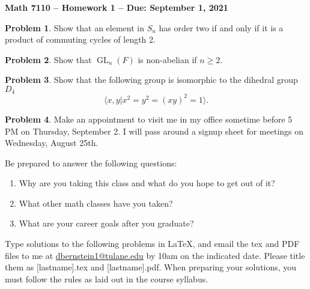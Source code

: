 \documentclass[letterpaper,11pt]{amsart}
\theoremstyle{plain}
\theoremstyle{definition}
\newtheorem{pr}{Problem}
\theoremstyle{remark}
\DeclareMathOperator{\gl}{GL}
\begin{document}
\Large

\begin{center}
{\bf Math 7110 -- Homework  1 --  Due:  September 1, 2021}
\end{center}

\normalsize



\medskip


\begin{pr}
    Show that an element in $S_n$ has order two if and only if it is a product of commuting cycles of length 2.
\end{pr}

\begin{pr}
    Show that $\gl_n(F)$ is non-abelian if $n \ge 2$.
\end{pr}

\begin{pr}
    Show that the following group is isomorphic to the dihedral group $D_4$
    \[
        \langle x,y | x^2=y^2=(xy)^2=1 \rangle.
    \]
\end{pr}

\begin{pr}
Make an appointment to visit me 
in my office sometime before 5 PM on Thursday, September 2.  I will pass around
a signup sheet for meetings on Wednesday, August 25th.

Be prepared
to answer the following questions:
\begin{enumerate}
\item  Why are you taking this class and what do you hope to get out of it?
\item  What other math classes have you taken?
\item  What are your career goals after you graduate?
\end{enumerate}
\end{pr}

\bigskip

Type solutions to the following problems in \LaTeX, and email the tex and PDF files to me at \url{dbernstein1@tulane.edu} by 10am on the indicated date.
Please title them as [lastname].tex and [lastname].pdf.
When preparing your solutions, you must follow the rules as laid out in the course syllabus.

\vspace{.5cm}

\end{document}
